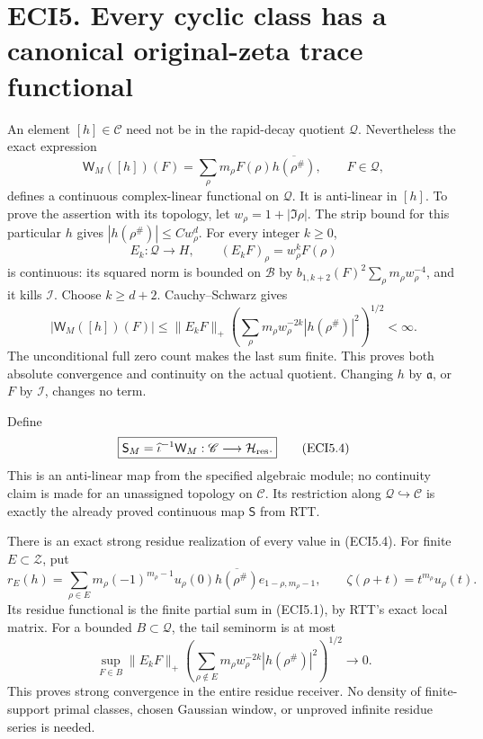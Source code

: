 \section{ECI5. Every cyclic class has a canonical original-zeta trace
functional}\label{eci5.-every-cyclic-class-has-a-canonical-original-zeta-trace-functional}

An element \([h]\in\mathscr C\) need not be in the rapid-decay quotient
\(\mathcal Q\). Nevertheless the exact expression \[
\mathsf W_M([h])(F)
=\sum_\rho m_\rho F(\rho)\overline{h(\rho^\#)},
\qquad F\in\mathcal Q,
\tag{ECI5.1}
\] defines a continuous complex-linear functional on \(\mathcal Q\). It
is anti-linear in \([h]\). To prove the assertion with its topology, let
\(w_\rho=1+|\Im\rho|\). The strip bound for this particular \(h\) gives
\(|h(\rho^\#)|\le Cw_\rho^d\). For every integer \(k\ge0\), \[
E_k:\mathcal Q\to H,\qquad (E_kF)_\rho=w_\rho^kF(\rho)
\tag{ECI5.2}
\] is continuous: its squared norm is bounded on \(\mathcal B\) by
\(b_{1,k+2}(F)^2\sum_\rho m_\rho w_\rho^{-4}\), and it kills
\(\mathcal I\). Choose \(k\ge d+2\). Cauchy--Schwarz gives \[
|\mathsf W_M([h])(F)|
\le\|E_kF\|_+
\left(\sum_\rho m_\rho w_\rho^{-2k}|h(\rho^\#)|^2\right)^{1/2}<\infty.
\tag{ECI5.3}
\] The unconditional full zero count makes the last sum finite. This
proves both absolute convergence and continuity on the actual quotient.
Changing \(h\) by \(\mathfrak a\), or \(F\) by \(\mathcal I\), changes
no term.

Define \[
\boxed{\mathsf S_M=\widehat\iota^{-1}\mathsf W_M:
\mathscr C\longrightarrow\mathcal H_{\rm res}.}
\tag{ECI5.4}
\] This is an anti-linear map from the specified algebraic module; no
continuity claim is made for an unassigned topology on \(\mathscr C\).
Its restriction along \(\mathcal Q\hookrightarrow\mathscr C\) is exactly
the already proved continuous map \(\mathsf S\) from RTT.

There is an exact strong residue realization of every value in (ECI5.4).
For finite \(E\subset\mathscr Z\), put \[
r_E(h)=\sum_{\rho\in E}
m_\rho(-1)^{m_\rho-1}u_\rho(0)
\overline{h(\rho^\#)}e_{1-\rho,m_\rho-1},
\qquad
\zeta(\rho+t)=t^{m_\rho}u_\rho(t).
\tag{ECI5.5}
\] Its residue functional is the finite partial sum in (ECI5.1), by
RTT's exact local matrix. For a bounded \(B\subset\mathcal Q\), the tail
seminorm is at most \[
\sup_{F\in B}\|E_kF\|_+
\left(\sum_{\rho\notin E}m_\rho w_\rho^{-2k}|h(\rho^\#)|^2\right)^{1/2}
\longrightarrow0.
\tag{ECI5.6}
\] This proves strong convergence in the entire residue receiver. No
density of finite-support primal classes, chosen Gaussian window, or
unproved infinite residue series is needed.

